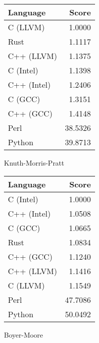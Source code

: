 \begin{subtable}{0.33\textwidth}
    \centering
    \begin{tabular}{|l|r|}
        \hline
        Language & Score \\
        \hline
        C (LLVM) & 1.0000 \\
        Rust & 1.1117 \\
        C++ (LLVM) & 1.1375 \\
        C (Intel) & 1.1398 \\
        C++ (Intel) & 1.2406 \\
        C (GCC) & 1.3151 \\
        C++ (GCC) & 1.4148 \\
        Perl & 38.5326 \\
        Python & 39.8713 \\
        \hline
    \end{tabular}
    \caption{Knuth-Morris-Pratt}
    \label{table:runtime:kmp}
\end{subtable}%
\begin{subtable}{0.33\textwidth}
    \centering
    \begin{tabular}{|l|r|}
        \hline
        Language & Score \\
        \hline
        C (Intel) & 1.0000 \\
        C++ (Intel) & 1.0508 \\
        C (GCC) & 1.0665 \\
        Rust & 1.0834 \\
        C++ (GCC) & 1.1240 \\
        C++ (LLVM) & 1.1416 \\
        C (LLVM) & 1.1549 \\
        Perl & 47.7086 \\
        Python & 50.0492 \\
        \hline
    \end{tabular}
    \caption{Boyer-Moore}
    \label{table:runtime:boyer_moore}
\end{subtable}%
